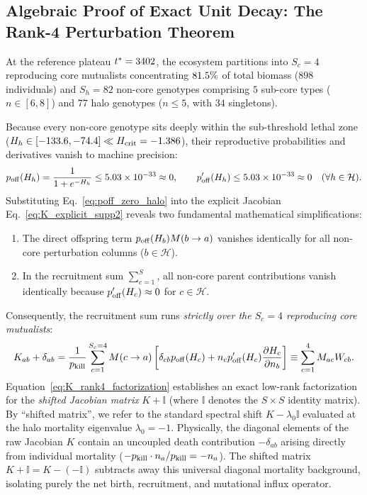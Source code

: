 \documentclass[11pt,a4paper]{article}
\newcommand{\pk}{p_{\rm kill}}
\newcommand{\poff}{p_{\rm off}}
\newcommand{\Hc}{H_{\rm crit}}
\begin{document}
\subsection{Algebraic Proof of Exact Unit Decay: The Rank-4 Perturbation Theorem}
\label{sec:rank4_proof}

At the reference plateau $t^* = 3402$, the ecosystem partitions into $S_c = 4$ reproducing core mutualists concentrating $81.5\%$ of total biomass ($898$ individuals) and $S_h = 82$ non-core genotypes comprising $5$ sub-core types ($n \in [6, 8]$) and $77$ halo genotypes ($n \le 5$, with $34$ singletons). 

Because every non-core genotype sits deeply within the sub-threshold lethal zone ($H_h \in [-133.6, -74.4] \ll \Hc = -1.386$), their reproductive probabilities and derivatives vanish to machine precision:
\begin{equation}
\poff(H_h) = \frac{1}{1 + e^{-H_h}} \le 5.03 \times 10^{-33} \approx 0, \qquad \poff'(H_h) \le 5.03 \times 10^{-33} \approx 0 \quad (\forall h \in \mathcal{H}).
\label{eq:poff_zero_halo}
\end{equation}
Substituting Eq.~\eqref{eq:poff_zero_halo} into the explicit Jacobian Eq.~\eqref{eq:K_explicit_supp2} reveals two fundamental mathematical simplifications:
\begin{enumerate}
    \item The direct offspring term $\poff(H_b) M(b \to a)$ vanishes identically for all non-core perturbation columns ($b \in \mathcal{H}$).
    \item In the recruitment sum $\sum_{c=1}^S$, all non-core parent contributions vanish identically because $\poff'(H_c) \approx 0$ for $c \in \mathcal{H}$.
\end{enumerate}
Consequently, the recruitment sum runs \emph{strictly over the $S_c = 4$ reproducing core mutualists}:
\begin{equation}
K_{ab} + \delta_{ab} = \frac{1}{\pk} \sum_{c=1}^{S_c=4} M(c \to a) \left[ \delta_{cb} \poff(H_c) + n_c \poff'(H_c) \frac{\partial H_c}{\partial n_b} \right] \equiv \sum_{c=1}^4 M_{ac} W_{cb}.
\label{eq:K_rank4_factorization}
\end{equation}
Equation~\eqref{eq:K_rank4_factorization} establishes an exact low-rank factorization for the \emph{shifted Jacobian matrix} $K + \mathbb{I}$ (where $\mathbb{I}$ denotes the $S \times S$ identity matrix). By ``shifted matrix'', we refer to the standard spectral shift $K - \lambda_0 \mathbb{I}$ evaluated at the halo mortality eigenvalue $\lambda_0 = -1$. Physically, the diagonal elements of the raw Jacobian $K$ contain an uncoupled death contribution $-\delta_{ab}$ arising directly from individual mortality ($-\pk \cdot n_a / \pk = -n_a$). The shifted matrix $K + \mathbb{I} = K - (-\mathbb{I})$ subtracts away this universal diagonal mortality background, isolating purely the net birth, recruitment, and mutational influx operator.
\end{document}
